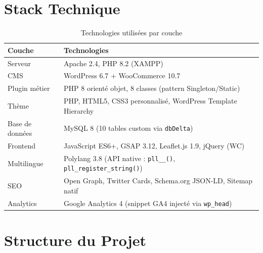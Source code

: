 \documentclass[12pt,a4paper]{report}
\begin{document}
\section{Stack Technique}

\begin{table}[H]
\centering
\caption{Technologies utilis\'ees par couche}
\begin{tabularx}{\linewidth}{lX}
  \toprule
  \textbf{Couche} & \textbf{Technologies} \\
  \midrule
  Serveur         & Apache 2.4, PHP 8.2 (XAMPP) \\
  CMS             & WordPress 6.7 + WooCommerce 10.7 \\
  Plugin m\'etier & PHP 8 orienté objet, 8 classes (pattern Singleton/Static) \\
  Th\`eme         & PHP, HTML5, CSS3 personnalis\'e, WordPress Template Hierarchy \\
  Base de donn\'ees & MySQL 8 (10 tables custom via \texttt{dbDelta}) \\
  Frontend        & JavaScript ES6+, GSAP 3.12, Leaflet.js 1.9, jQuery (WC) \\
  Multilingue     & Polylang 3.8 (API native : \texttt{pll\_\_()}, \texttt{pll\_register\_string()}) \\
  SEO             & Open Graph, Twitter Cards, Schema.org JSON-LD, Sitemap natif \\
  Analytics       & Google Analytics 4 (snippet GA4 inject\'e via \texttt{wp\_head}) \\
  \bottomrule
\end{tabularx}
\end{table}

\section{Structure du Projet}
\end{document}
